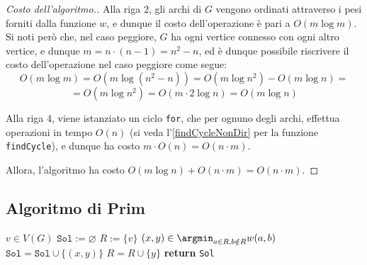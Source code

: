 \documentclass[a4paper, 12pt]{report}
\begin{document}
    \begin{proof}[Costo dell'algoritmo.]
        Alla riga 2, gli archi di $G$ vengono ordinati attraverso i pesi forniti dalla funzione $w$, e dunque il costo dell'operazione è pari a $O(m \log m)$. Si noti però che, nel caso peggiore, $G$ ha ogni vertice connesso con ogni altro vertice, e dunque $m = n\cdot ( n - 1) = n^2 - n$, ed è dunque possibile riscrivere il costo dell'operazione nel caso peggiore come segue: $$O (m \log m) = O(m \log (n^2 - n)) = O(m \log n^2) - O(m \log n) =$$ $$= O(m \log n^2) = O(m \cdot 2 \log n) = O(m \log n)$$

        Alla riga 4, viene istanziato un ciclo \texttt{for}, che per ognuno degli archi, effettua operazioni in tempo $O(n)$ (si veda l'\cref{findCycleNonDir} per la funzione \texttt{findCycle}), e dunque ha costo $m \cdot O(n) = O(n \cdot m)$.

        Allora, l'algoritmo ha costo $O(m \log n) + O(n \cdot m) = O(n \cdot m)$.
    \end{proof}

    \subsection{Algoritmo di Prim}

    \begin{algorithm}[H]
        \caption{
            Dato un grafo indiretto connesso $G$, pesato attraverso $w$ con pesi positivi, l'algoritmo ne restituisce un MST.\\
            \textbf{Input}: $G$ grafo indiretto connesso; $w$ una funzione che associa pesi positivi agli archi in $E(G)$.\\
            \textbf{Output}: un MST di $G$.
        }

        \begin{algorithmic}[1]
                \State $v \in V(G)$
                \State $\texttt{Sol} := \varnothing$
                \State $R := \{v\}$
                    \State $\displaystyle (x, y) \in \argmin_{a \in R, b \notin R} {w(a, b)}$
                    \State $\texttt{Sol} = \texttt{Sol} \cup \{ (x, y) \}$
                    \State $R = R \cup \{y\}$
                \EndWhile
                \State \textbf{return} \texttt{Sol}
            \EndFunction
        \end{algorithmic}
    \end{algorithm}
\end{document}
